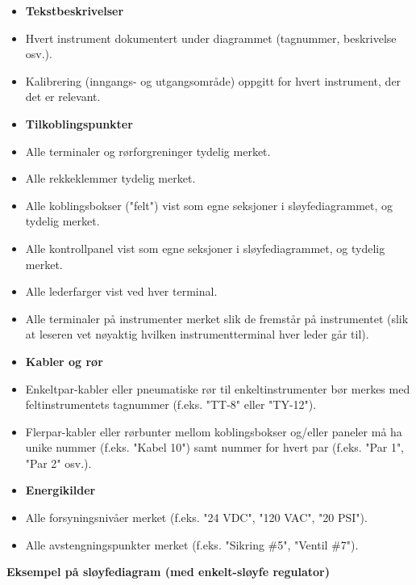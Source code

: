 \begin{itemize}
\item{} {\bf Tekstbeskrivelser}
\item{} Hvert instrument dokumentert under diagrammet (tagnummer, beskrivelse osv.).
\item{} Kalibrering (inngangs- og utgangsområde) oppgitt for hvert instrument, der det er relevant.
\end{itemize}

\begin{itemize}
\item{} {\bf Tilkoblingspunkter}
\item{} Alle terminaler og rørforgreninger tydelig merket.
\item{} Alle rekkeklemmer tydelig merket.
\item{} Alle koblingsbokser ("felt") vist som egne seksjoner i sløyfediagrammet, og tydelig merket.
\item{} Alle kontrollpanel vist som egne seksjoner i sløyfediagrammet, og tydelig merket.
\item{} Alle lederfarger vist ved hver terminal.
\item{} Alle terminaler på instrumenter merket slik de fremstår på instrumentet (slik at leseren vet nøyaktig hvilken instrumentterminal hver leder går til).
\end{itemize}

\begin{itemize}
\item{} {\bf Kabler og rør}
\item{} Enkeltpar-kabler eller pneumatiske rør til enkeltinstrumenter bør merkes med feltinstrumentets tagnummer (f.eks. "TT-8" eller "TY-12").
\item{} Flerpar-kabler eller rørbunter mellom koblingsbokser og/eller paneler må ha unike nummer (f.eks. "Kabel 10") samt nummer for hvert par (f.eks. "Par 1", "Par 2" osv.).
\end{itemize}

\begin{itemize}
\item{} {\bf Energikilder}
\item{} Alle forsyningsnivåer merket (f.eks. "24 VDC", "120 VAC", "20 PSI").
\item{} Alle avstengningspunkter merket (f.eks. "Sikring \#5", "Ventil \#7").
\end{itemize}

\vfil \eject

\noindent
{\bf Eksempel på sløyfediagram (med enkelt-sløyfe regulator)}

